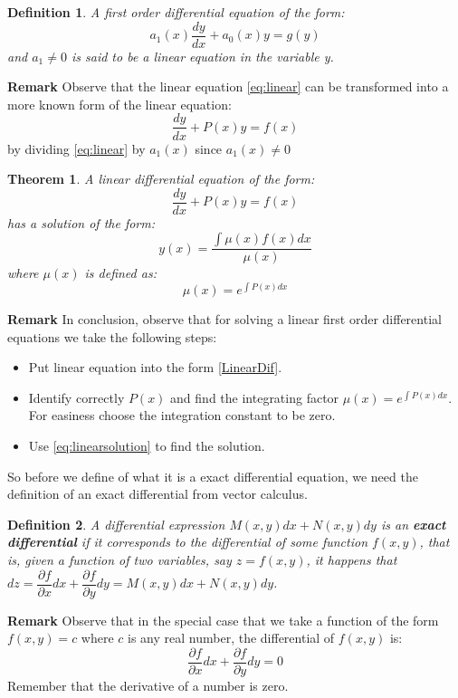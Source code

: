 \documentclass[10pt,a4paper]{article}
\newtheorem{define}{Definition}
\newtheorem{thm}{Theorem}
\begin{document}
\begin{define}
A first order differential equation of the form:
\begin{equation} \label{eq:linear}
a_1(x)\dfrac{dy}{dx} + a_0(x)y = g(y)
\end{equation}
and $a_1 \neq 0$ is said to be a linear equation in the variable y.
\end{define}
\textbf{Remark} Observe that the linear equation \eqref{eq:linear}
can be transformed into a more known form of the linear equation:
\begin{equation} \label{LinearDif}
\dfrac{dy}{dx} + P(x)y 	= f(x)
\end{equation}
by dividing \eqref{eq:linear} by $a_1(x)$ since $a_1(x) \neq 0$
\begin{thm}
A linear differential equation of the form:
\begin{equation*}
\dfrac{dy}{dx} + P(x)y 	= f(x)
\end{equation*}
has a solution of the form:
\begin{equation} \label{eq:linearsolution}
y(x) = \dfrac{\int \mu(x)f(x)dx}{ \mu(x)}
\end{equation}
where $\mu(x)$ is defined as:
\begin{equation*}
\mu(x) = e^{ \int P(x) dx}
\end{equation*}
\end{thm}
\textbf{Remark} In conclusion, observe that for solving a linear first order differential equations we take the following steps:
\begin{itemize}
\item Put linear equation into the form \eqref{LinearDif}.
\item Identify correctly $P(x)$ and find the integrating factor $ \mu(x) = e^{ \int P(x) dx}$. For easiness choose the integration constant to be zero.
\item Use \eqref{eq:linearsolution} to find the solution.
\end{itemize} 
So before we define of what it is a exact differential equation, we need the definition of an exact differential from vector calculus.
\begin{define}
A differential expression $ M(x,y)dx + N(x,y)dy $ is an \textbf{exact differential} if it corresponds to the differential of some function $f(x,y)$, that is, given a function of two variables, say $ z = f(x,y) $, it happens that $ dz =  \dfrac{\partial f}{\partial x}dx + \dfrac{\partial f}{\partial y}dy = M(x,y)dx + N(x,y)dy $.
\end{define}
\textbf{Remark}
Observe that in the special case that we take a function of the form $ f(x,y) = c $ where $c$ is any real number, the differential of $f(x,y)$ is:
\begin{equation*}
\dfrac{\partial f}{\partial x} dx + \dfrac{\partial f}{\partial y} dy = 0
\end{equation*}
Remember that the derivative of a number is zero. 
\end{document}
